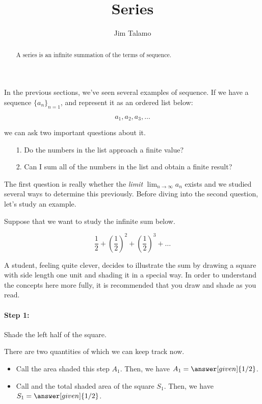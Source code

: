 \documentclass{ximera}
\author{Jim Talamo}
\title[Dig-In:]{Series}
\begin{document}
\begin{abstract}
A series is an infinite summation of the terms of sequence.
\end{abstract}
\maketitle

In the previous sections, we've seen several examples of sequence.  If we have a sequence $\{a_n\}_{n=1}$, and represent it as an ordered list below: 

\[
a_1, a_2, a_3 , \ldots
\]

we can ask two important questions about it.

\begin{itemize}
\item[1.] Do the numbers in the list approach a finite value?
\item[2.] Can I sum all of the numbers in the list and obtain a finite result?
\end{itemize}

The first question is really whether the \emph{limit} $\lim_{n \to \infty} a_n$ exists and we studied several ways to determine this previously.  Before diving into the second question, let's study an example.

Suppose that we want to study the infinite sum below.

\[
\frac{1}{2} + \left(\frac{1}{2}\right)^2+ \left(\frac{1}{2}\right)^3+ \ldots
\]

A student, feeling quite clever, decides to illustrate the sum by drawing a square with side length one unit and shading it in a special way.  In order to understand the concepts here more fully, it is recommended that you draw and shade as you read.

\paragraph{Step 1:} Shade the left half of the square.  

\begin{image}[1in]

\end{image}
There are two quantities of which we can keep track now.
\begin{itemize}
\item Call the area shaded this step $A_1$.  Then, we have $A_1=\answer[given]{1/2}$.
\item Call and the total shaded area  of the square $S_1$.  Then, we have $S_1=\answer[given]{1/2}$.
\end{itemize}
\end{document}
